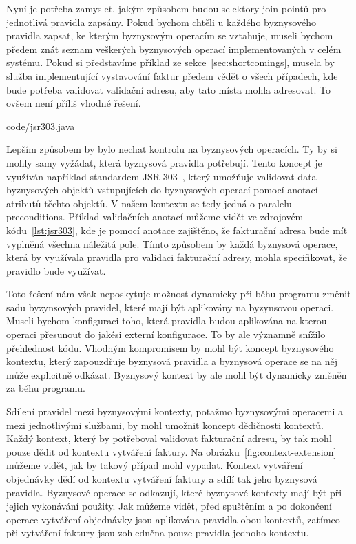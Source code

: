 Nyní je potřeba zamyslet, jakým způsobem budou selektory join-pointů pro jednotlivá pravidla zapsány.
Pokud bychom chtěli u každého byznysového pravidla zapsat, ke kterým byznysovým operacím se vztahuje,
museli bychom předem znát seznam veškerých byznysových operací implementovaných v celém systému. Pokud si
představíme příklad ze sekce~\ref{sec:shortcomings}, musela by služba implementující vystavování
faktur předem vědět o všech případech, kde bude potřeba validovat validační adresu, aby tato místa mohla
adresovat. To ovšem není příliš vhodné řešení.


{code/jsr303.java}

Lepším způsobem by bylo nechat kontrolu na byznysových operacích. Ty by si mohly samy vyžádat,
která byznysová pravidla potřebují. Tento koncept je využíván například standardem \gls{JSR}
303~\cite{bernard2009jsr}, který umožňuje validovat data byznysových objektů vstupujících do
byznysových operací pomocí anotací atributů těchto objektů. V našem kontextu se tedy jedná o
paralelu preconditions. Příklad validačních anotací můžeme vidět ve zdrojovém kódu~\ref{lst:jsr303},
kde je pomocí anotace \code{\@NotNull} zajištěno, že fakturační adresa bude mít vyplněná všechna
náležitá pole. Tímto způsobem by každá byznysová operace, která by využívala pravidla pro validaci
fakturační adresy, mohla specifikovat, že pravidlo bude využívat.

Toto řešení nám však neposkytuje možnost dynamicky při běhu programu změnit sadu byzynsových pravidel,
které mají být aplikovány na byzynsovou operaci. Museli bychom konfiguraci toho, která pravidla
budou aplikována na kterou operaci přesunout do jakési externí konfigurace. To by ale významně
snížilo přehlednost kódu. Vhodným kompromisem by mohl být koncept byznysového kontextu, který
zapouzdřuje byznysová pravidla a byznysová operace se na něj může explicitně odkázat. Byznysový kontext
by ale mohl být dynamicky změněn za běhu programu.

Sdílení pravidel mezi byznysovými kontexty, potažmo byznysovými operacemi a mezi jednotlivými službami,
by mohl umožnit koncept dědičnosti kontextů. Každý kontext, který by potřeboval validovat fakturační
adresu, by tak mohl pouze dědit od kontextu vytváření faktury. Na obrázku~\ref{fig:context-extension} můžeme vidět,
jak by takový případ mohl vypadat. Kontext vytváření objednávky dědí od kontextu vytváření faktury
a sdílí tak jeho byznysová pravidla. Byznysové operace se odkazují, které byznysové kontexty mají
být při jejich vykonávání použity. Jak můžeme vidět, před spuštěním a po dokončení operace vytváření
objednávky jsou aplikována pravidla obou kontextů, zatímco při vytváření faktury jsou zohledněna
pouze pravidla jednoho kontextu.

